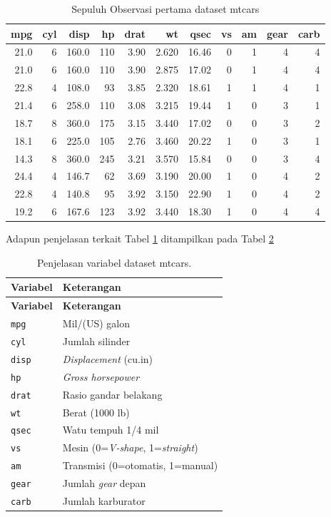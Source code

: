 \documentclass[12pt,]{krantz}
\begin{document}
\begin{table}

\caption{\label{tab:mtcars}Sepuluh Observasi pertama dataset mtcars}
\centering
\begin{tabular}[t]{r|r|r|r|r|r|r|r|r|r|r}
\hline
mpg & cyl & disp & hp & drat & wt & qsec & vs & am & gear & carb\\
\hline
21.0 & 6 & 160.0 & 110 & 3.90 & 2.620 & 16.46 & 0 & 1 & 4 & 4\\
\hline
21.0 & 6 & 160.0 & 110 & 3.90 & 2.875 & 17.02 & 0 & 1 & 4 & 4\\
\hline
22.8 & 4 & 108.0 & 93 & 3.85 & 2.320 & 18.61 & 1 & 1 & 4 & 1\\
\hline
21.4 & 6 & 258.0 & 110 & 3.08 & 3.215 & 19.44 & 1 & 0 & 3 & 1\\
\hline
18.7 & 8 & 360.0 & 175 & 3.15 & 3.440 & 17.02 & 0 & 0 & 3 & 2\\
\hline
18.1 & 6 & 225.0 & 105 & 2.76 & 3.460 & 20.22 & 1 & 0 & 3 & 1\\
\hline
14.3 & 8 & 360.0 & 245 & 3.21 & 3.570 & 15.84 & 0 & 0 & 3 & 4\\
\hline
24.4 & 4 & 146.7 & 62 & 3.69 & 3.190 & 20.00 & 1 & 0 & 4 & 2\\
\hline
22.8 & 4 & 140.8 & 95 & 3.92 & 3.150 & 22.90 & 1 & 0 & 4 & 2\\
\hline
19.2 & 6 & 167.6 & 123 & 3.92 & 3.440 & 18.30 & 1 & 0 & 4 & 4\\
\hline
\end{tabular}
\end{table}

Adapun penjelasan terkait Tabel \ref{tab:mtcars} ditampilkan pada Tabel \ref{tab:mtcars2}

\begin{longtable}[]{@{}ll@{}}
\caption{\label{tab:mtcars2} Penjelasan variabel dataset mtcars.}\tabularnewline
\toprule
\textbf{Variabel} & \textbf{Keterangan}\tabularnewline
\midrule
\endfirsthead
\toprule
\textbf{Variabel} & \textbf{Keterangan}\tabularnewline
\midrule
\endhead
\texttt{mpg} & Mil/(US) galon\tabularnewline
\texttt{cyl} & Jumlah silinder\tabularnewline
\texttt{disp} & \emph{Displacement} (cu.in)\tabularnewline
\texttt{hp} & \emph{Gross horsepower}\tabularnewline
\texttt{drat} & Rasio gandar belakang\tabularnewline
\texttt{wt} & Berat (1000 lb)\tabularnewline
\texttt{qsec} & Watu tempuh 1/4 mil\tabularnewline
\texttt{vs} & Mesin (0=\emph{V-shape}, 1=\emph{straight})\tabularnewline
\texttt{am} & Transmisi (0=otomatis, 1=manual)\tabularnewline
\texttt{gear} & Jumlah \emph{gear} depan\tabularnewline
\texttt{carb} & Jumlah karburator\tabularnewline
\bottomrule
\end{longtable}
\end{document}
